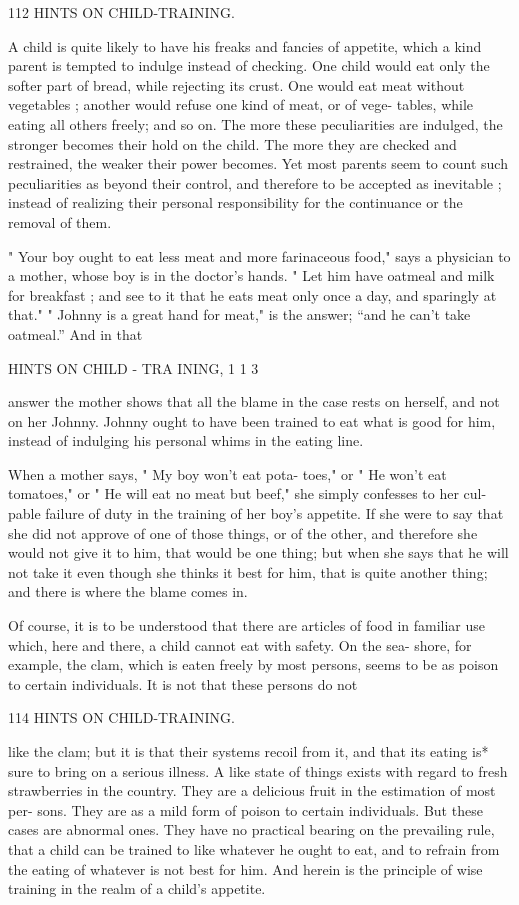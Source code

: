 \documentclass[
]{book}
\begin{document}
112 HINTS ON CHILD-TRAINING.

A child is quite likely to have his freaks and fancies of appetite, which a kind parent is tempted to indulge instead of checking. One child would eat only the softer part of bread, while rejecting its crust. One would eat meat without vegetables ; another would refuse one kind of meat, or of vege- tables, while eating all others freely; and so on. The more these peculiarities are indulged, the stronger becomes their hold on the child. The more they are checked and restrained, the weaker their power becomes. Yet most parents seem to count such peculiarities as beyond their control, and therefore to be accepted as inevitable ; instead of realizing their personal responsibility for the continuance or the removal of them.

" Your boy ought to eat less meat and more farinaceous food," says a physician to a mother, whose boy is in the doctor's hands. " Let him have oatmeal and milk for breakfast ; and see to it that he eats meat only once a day, and sparingly at that." " Johnny is a great hand for meat," is the answer; ``and he can't take oatmeal.'' And in that

HINTS ON CHILD - TRA INING, 1 1 3

answer the mother shows that all the blame in the case rests on herself, and not on her Johnny. Johnny ought to have been trained to eat what is good for him, instead of indulging his personal whims in the eating line.

When a mother says, " My boy won't eat pota- toes," or " He won't eat tomatoes," or " He will eat no meat but beef," she simply confesses to her cul- pable failure of duty in the training of her boy's appetite. If she were to say that she did not approve of one of those things, or of the other, and therefore she would not give it to him, that would be one thing; but when she says that he will not take it even though she thinks it best for him, that is quite another thing; and there is where the blame comes in.

Of course, it is to be understood that there are articles of food in familiar use which, here and there, a child cannot eat with safety. On the sea- shore, for example, the clam, which is eaten freely by most persons, seems to be as poison to certain individuals. It is not that these persons do not

114 HINTS ON CHILD-TRAINING.

like the clam; but it is that their systems recoil from it, and that its eating is* sure to bring on a serious illness. A like state of things exists with regard to fresh strawberries in the country. They are a delicious fruit in the estimation of most per- sons. They are as a mild form of poison to certain individuals. But these cases are abnormal ones. They have no practical bearing on the prevailing rule, that a child can be trained to like whatever he ought to eat, and to refrain from the eating of whatever is not best for him. And herein is the principle of wise training in the realm of a child's appetite.
\end{document}
